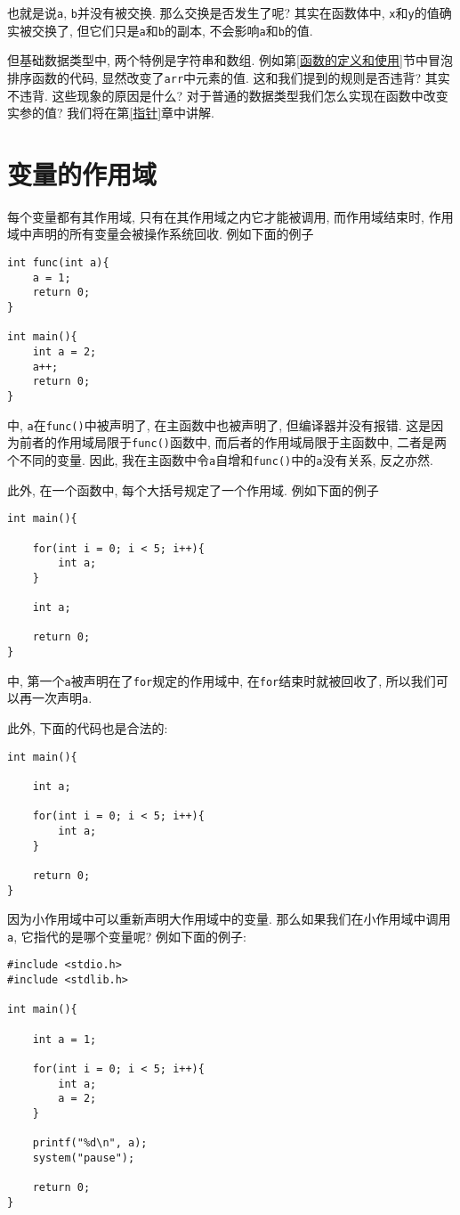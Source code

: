         也就是说\texttt{a}, \texttt{b}并没有被交换. 那么交换是否发生了呢? 其实在函数体中, \texttt{x}和\texttt{y}的值确实被交换了, 但它们只是\texttt{a}和\texttt{b}的副本, 不会影响\texttt{a}和\texttt{b}的值.

        但基础数据类型中, 两个特例是字符串和数组. 例如第\ref{函数的定义和使用}节中冒泡排序函数的代码, 显然改变了\texttt{arr}中元素的值. 这和我们提到的规则是否违背? 其实不违背. 这些现象的原因是什么? 对于普通的数据类型我们怎么实现在函数中改变实参的值? 我们将在第\ref{指针}章中讲解.

    \section{变量的作用域} \label{变量的作用域}
        每个变量都有其作用域, 只有在其作用域之内它才能被调用, 而作用域结束时, 作用域中声明的所有变量会被操作系统回收. 例如下面的例子
\begin{lstlisting}
int func(int a){
    a = 1;
    return 0;
}

int main(){
    int a = 2;
    a++;
    return 0;
}
\end{lstlisting}
        中, \texttt{a}在\texttt{func()}中被声明了, 在主函数中也被声明了, 但编译器并没有报错. 这是因为前者的作用域局限于\texttt{func()}函数中, 而后者的作用域局限于主函数中, 二者是两个不同的变量. 因此, 我在主函数中令\texttt{a}自增和\texttt{func()}中的\texttt{a}没有关系, 反之亦然.

        此外, 在一个函数中, 每个大括号规定了一个作用域. 例如下面的例子
\begin{lstlisting}
int main(){

    for(int i = 0; i < 5; i++){
        int a;
    }

    int a;

    return 0;
}
\end{lstlisting}
        中, 第一个\texttt{a}被声明在了\texttt{for}规定的作用域中, 在\texttt{for}结束时就被回收了, 所以我们可以再一次声明\texttt{a}.

        此外, 下面的代码也是合法的:
\begin{lstlisting}
int main(){

    int a;

    for(int i = 0; i < 5; i++){
        int a;
    }

    return 0;
}
\end{lstlisting}

        因为小作用域中可以重新声明大作用域中的变量. 那么如果我们在小作用域中调用\texttt{a}, 它指代的是哪个变量呢? 例如下面的例子:
\begin{lstlisting}
#include <stdio.h>
#include <stdlib.h>

int main(){

    int a = 1;

    for(int i = 0; i < 5; i++){
        int a;
        a = 2;
    }

    printf("%d\n", a);
    system("pause");

    return 0;
}
\end{lstlisting}

